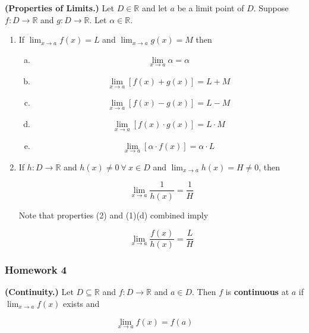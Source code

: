 \begin{proposition} \textbf{(Properties of Limits.)} Let \(D \in \mathbb{R}\) and let \(a\) be a limit point of \(D\). Suppose \(f:D \to \mathbb{R}\) and \(g: D \to \mathbb{R}\). Let \(\alpha \in \mathbb{R}\).

\begin{enumerate}[(1)]

\item If \(\lim_{x \to a} f(x) = L\) and \(\lim_{x \to a} g(x) = M\) then

\begin{enumerate}[(a)]

\item \[\lim_{x \to a} \alpha = \alpha\]

\item \[\lim_{x \to a} [f(x) + g(x)] = L + M\]

\item \[\lim_{x \to a} [f(x) - g(x)] = L - M\]

\item \[\lim_{x \to a} [f(x) \cdot g(x)] = L \cdot M\]

\item \[\lim_{x \to a} [\alpha \cdot f(x)] = \alpha \cdot L\]

\end{enumerate}

\item If \(h:D \to \mathbb{R}\) and \(h(x) \neq 0 \ \forall \ x \in D\) and \(\lim_{x \to a} h(x) = H \neq 0\), then

\[
\lim_{x \to a} \frac{1}{h(x)} = \frac{1}{H}
\]

Note that properties (2) and (1)(d) combined imply

\[
\lim_{x \to a} \frac{f(x)}{h(x)} = \frac{L}{H}
\]

\end{enumerate}

\end{proposition}

\subsubsection{Homework 4}

\begin{definition} \textbf{(Continuity.)} Let \(D \subseteq \mathbb{R}\) and \(f:D \to \mathbb{R}\) and \(a \in D\). Then \(f\) is \textbf{continuous} at \(a\) if \(\lim_{x \to a} f(x)\) exists and 

\[
\lim_{x \to a} f(x) = f(a)
\]

\end{definition}

